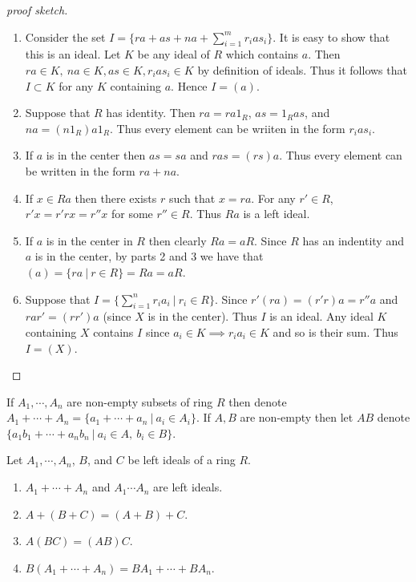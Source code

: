 \begin{proof}[proof sketch]
  \begin{enumerate}
    \item Consider the set $I = \{ra+ as + na + \sum_{i=1}^m r_i a s_i\}$. It is easy to show that this is an ideal. Let $K$ be any ideal of $R$ which contains $a$. Then $ra\in K,\ na\in K, as\in K, r_ias_i\in K$ by definition of ideals. Thus it follows that $I\subset K$ for any $K$ containing $a$. Hence $I = (a)$.
    \item Suppose that $R$ has identity. Then $ra = ra1_R$, $as = 1_R as$, and $na = (n1_R)a 1_R$. Thus every element can be wriiten in the form $r_ias_i$.
    \item If $a$ is in the center then $as = sa$ and $ras = (rs)a$. Thus every element can be written in the form $ra+na$.
    \item If $x\in Ra$ then there exists $r$ such that $x = ra$. For any $r'\in R$, $r'x = r'rx = r'' x$ for some $r''\in R$. Thus $Ra$ is a left ideal.
    \item If $a$ is in the center in $R$ then clearly $Ra = aR$. Since $R$ has an indentity and $a$ is in the center, by parts 2 and 3 we have that $(a) = \{ra\ |\ r\in R\} = Ra = aR$.
    \item Suppose that $I = \{\sum_{i=1}^n r_ia_i\ |\ r_i\in R\}$. Since $r'(ra) = (r'r)a = r''a$ and $rar' = (rr')a$ (since $X$ is in the center). Thus $I$ is an ideal. Any ideal $K$ containing $X$ contains $I$ since $a_i\in K \implies r_i a_i\in K$ and so is their sum. Thus $I = (X)$.
  \end{enumerate}
\end{proof}
\begin{definition}
  If $A_1,\cdots, A_n$ are non-empty subsets of ring $R$ then denote $A_1 + \cdots + A_n = \{a_1+\cdots + a_n\ |\ a_i\in A_i\}$. If $A,B$ are non-empty then let $AB$ denote $\{a_1b_1+\cdots +a_nb_n\ |\ a_i\in A,\ b_i\in B\}$.
\end{definition}
\begin{theorem}
  Let $A_1,\cdots, A_n$, $B$, and $C$ be left ideals of a ring $R$.
  \begin{enumerate}
    \item $A_1+\cdots + A_n$ and $A_1\cdots A_n$ are left ideals.
    \item $A+(B+C) = (A+B)+C$.
    \item $A(BC) = (AB)C$.
    \item $B(A_1+\cdots + A_n) = BA_1 + \cdots + BA_n$.
  \end{enumerate}
\end{theorem}

